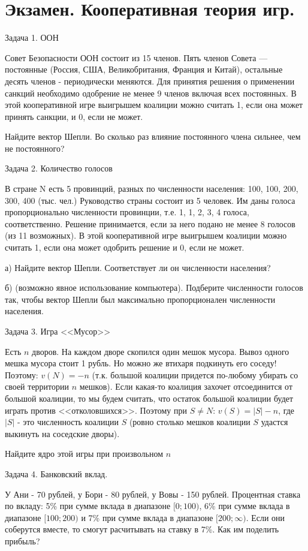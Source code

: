 \section{Экзамен. Кооперативная теория игр.}

Задача 1. ООН

Совет Безопасности ООН состоит из 15 членов. Пять членов Совета — постоянные (Россия, США, Великобритания, Франция и Китай), остальные десять членов - периодически меняются. Для принятия решения о применении санкций необходимо одобрение не менее 9 членов включая всех постоянных. В этой кооперативной игре выигрышем коалиции можно считать 1, если она может принять санкции, и 0, если не может.

Найдите вектор Шепли. Во сколько раз влияние постоянного члена сильнее, чем не постоянного?

Задача 2. Количество голосов

В стране N есть 5 провинций, разных по численности населения: 100, 100, 200, 300, 400 (тыс. чел.) Руководство страны состоит из 5 человек. Им даны голоса пропорционально численности провинции, т.е. 1, 1, 2, 3, 4 голоса, соответственно. Решение принимается, если за него подано не менее 8 голосов (из 11 возможных). В этой кооперативной игре выигрышем коалиции можно считать 1, если она может одобрить решение и 0, если не может.

а) Найдите вектор Шепли. Соответствует ли он численности населения?

б) (возможно явное использование компьютера). Подберите численности голосов так, чтобы вектор Шепли был максимально пропорционален численности населения.



Задача 3. Игра <<Мусор>>

Есть $n$ дворов. На каждом дворе скопился один мешок мусора. Вывоз одного мешка мусора стоит 1 рубль. Но можно же втихаря подкинуть его соседу! Поэтому: $v(N)=-n$ (т.к. большой коалиции придется по-любому убирать со своей территории $n$ мешков). Если какая-то коалиция захочет отсоединится от большой коалиции, то мы будем считать, что остаток большой коалиции будет играть против <<отколовшихся>>. Поэтому при $S\neq N$: $v(S)=|S|-n$, где $|S|$ - это численность коалиции $S$ (ровно столько мешков коалиции $S$ удастся выкинуть на соседские дворы).

Найдите ядро этой игры при произвольном $n$


Задача 4. Банковский вклад.

У Ани - 70 рублей, у Бори - 80 рублей, у Вовы - 150 рублей. Процентная ставка по вкладу: 5\% при сумме вклада в диапазоне $[0;100)$, 6\% при сумме вклада в диапазоне $[100;200)$ и 7\% при сумме вклада в диапазоне $[200;\infty)$. Если они соберутся вместе, то смогут расчитывать на ставку в 7\%. Как им поделить прибыль?

